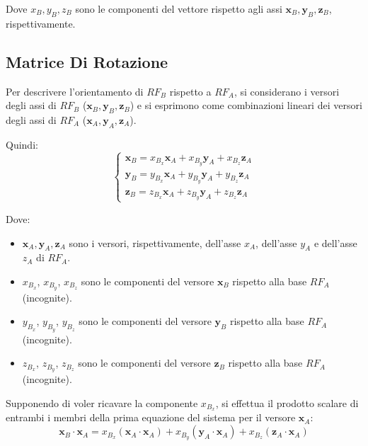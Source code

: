 \documentclass[11pt, a4paper]{report}
\begin{document}
Dove $x_B, y_B, z_B$ sono le componenti del vettore rispetto agli assi $\mathbf{x}_B, \mathbf{y}_B, \mathbf{z}_B$, rispettivamente.
\newpage
\subsection{Matrice Di Rotazione}


Per descrivere l'orientamento di $RF_{B}$ rispetto a $RF_{A}$, si considerano i versori degli assi di $RF_{B}$ ($\mathbf{x}_{B}, \mathbf{y}_{B}, \mathbf{z}_{B}$) e si esprimono come combinazioni lineari dei versori degli assi di $RF_{A}$ ($\mathbf{x}_{A}, \mathbf{y}_{A}, \mathbf{z}_{A}$).


Quindi:
\[
    \begin{cases}
        \mathbf{x}_B = x_{B_x} \mathbf{x}_A + x_{B_y} \mathbf{y}_A + x_{B_z} \mathbf{z}_A\\
        \mathbf{y}_B = y_{B_x} \mathbf{x}_A + y_{B_y} \mathbf{y}_A + y_{B_z} \mathbf{z}_A\\
        \mathbf{z}_B = z_{B_x} \mathbf{x}_A + z_{B_y} \mathbf{y}_A + z_{B_z} \mathbf{z}_A
    \end{cases}
\]

Dove:
\begin{itemize}
    \item $\mathbf{x}_A, \mathbf{y}_A, \mathbf{z}_A$ sono i versori, rispettivamente, dell'asse $x_A$, dell'asse $y_A$ e dell'asse $z_A$ di $RF_A$.
    \item $x_{B_x}$, $x_{B_y}$, $x_{B_z}$ sono le componenti del versore $\mathbf{x}_B$ rispetto alla base $RF_A$ (incognite).
    \item $y_{B_x}$, $y_{B_y}$, $y_{B_z}$ sono le componenti del versore $\mathbf{y}_B$ rispetto alla base $RF_A$ (incognite).
    \item $z_{B_x}$, $z_{B_y}$, $z_{B_z}$ sono le componenti del versore $\mathbf{z}_B$ rispetto alla base $RF_A$ (incognite).
\end{itemize}

Supponendo di voler ricavare la componente $x_{B_x}$, si effettua il prodotto scalare di entrambi i membri della prima equazione del sistema per il versore $\mathbf{x}_A$:
\[
    \mathbf{x}_B \cdot \mathbf{x}_A =
    x_{B_x} (\mathbf{x}_A \cdot \mathbf{x}_A) +
    x_{B_y} (\mathbf{y}_A \cdot \mathbf{x}_A) +
    x_{B_z} (\mathbf{z}_A \cdot \mathbf{x}_A)
\]
\end{document}
